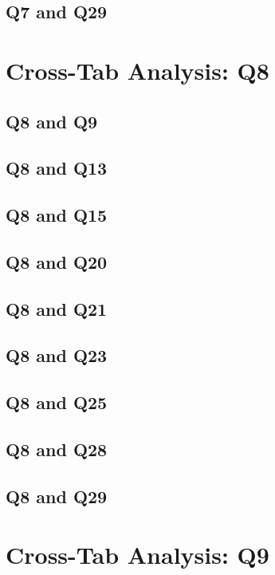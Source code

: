 \documentclass{report}
\begin{document}
\section{Q7 and Q29}\clearpage

\chapter{Cross-Tab Analysis: Q8}

\section{Q8 and Q9}\clearpage
\section{Q8 and Q13}\clearpage
\section{Q8 and Q15}\clearpage
\section{Q8 and Q20}\clearpage
\section{Q8 and Q21}\clearpage
\section{Q8 and Q23}\clearpage
\section{Q8 and Q25}\clearpage
\section{Q8 and Q28}\clearpage
\section{Q8 and Q29}\clearpage

\chapter{Cross-Tab Analysis: Q9}
\end{document}
